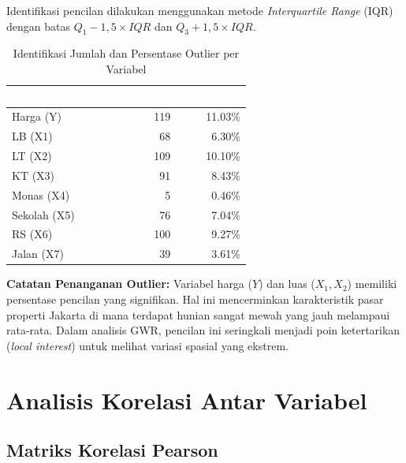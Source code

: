 \documentclass[12pt,a4paper]{article}
\begin{document}
Identifikasi pencilan dilakukan menggunakan metode \textit{Interquartile Range} (IQR) dengan batas $Q_1 - 1,5 \times IQR$ dan $Q_3 + 1,5 \times IQR$.

\begin{table}[H]
\centering
\caption{Identifikasi Jumlah dan Persentase Outlier per Variabel}
\label{tab:outliers}
\begin{tabular}{lrr}
\toprule
\rowcolor{headerblue}
\textcolor{white}{\textbf{Variabel}} & \textcolor{white}{\textbf{Jumlah Outlier}} & \textcolor{white}{\textbf{Persentase}} \\
\midrule
\rowcolor{rowlight}
Harga (Y) & 119 & 11.03\% \\
LB (X1) & 68 & 6.30\% \\
\rowcolor{rowlight}
LT (X2) & 109 & 10.10\% \\
KT (X3) & 91 & 8.43\% \\
\rowcolor{rowlight}
Monas (X4) & 5 & 0.46\% \\
Sekolah (X5) & 76 & 7.04\% \\
\rowcolor{rowlight}
RS (X6) & 100 & 9.27\% \\
Jalan (X7) & 39 & 3.61\% \\
\bottomrule
\end{tabular}
\end{table}

\noindent \textbf{Catatan Penanganan Outlier:} 
Variabel harga ($Y$) dan luas ($X_1, X_2$) memiliki persentase pencilan yang signifikan. Hal ini mencerminkan karakteristik pasar properti Jakarta di mana terdapat hunian sangat mewah yang jauh melampaui rata-rata. Dalam analisis GWR, pencilan ini seringkali menjadi poin ketertarikan (\textit{local interest}) untuk melihat variasi spasial yang ekstrem.

\newpage
\section{Analisis Korelasi Antar Variabel}

\subsection{Matriks Korelasi Pearson}
\end{document}
